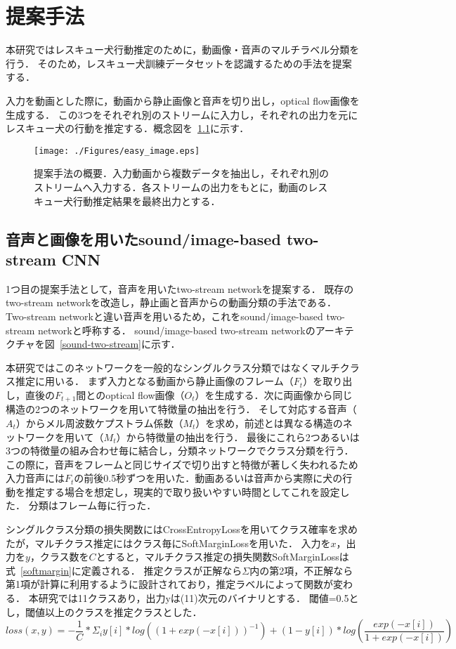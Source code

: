 \chapter{提案手法}
本研究ではレスキュー犬行動推定のために，動画像・音声のマルチラベル分類を行う．
そのため，レスキュー犬訓練データセットを認識するための手法を提案する．

入力を動画とした際に，動画から静止画像と音声を切り出し，optical flow画像を生成する．
この3つをそれぞれ別のストリームに入力し，それぞれの出力を元にレスキュー犬の行動を推定する．概念図を~\ref{easy_image}に示す．
\begin{figure}[H]
 \begin{center}
  \texttt{[image: ./Figures/easy\_image.eps]}
  \caption{提案手法の概要．入力動画から複数データを抽出し，それぞれ別のストリームへ入力する．各ストリームの出力をもとに，動画のレスキュー犬行動推定結果を最終出力とする．}
  \label{easy_image}
 \end{center}
\end{figure}

\section{音声と画像を用いたsound/image-based two-stream CNN}
1つ目の提案手法として，音声を用いたtwo-stream networkを提案する．
既存のtwo-stream networkを改造し，静止画と音声からの動画分類の手法である．
Two-stream networkと違い音声を用いるため，これをsound/image-based two-stream networkと呼称する．
sound/image-based two-stream networkのアーキテクチャを図~\ref{sound-two-stream}に示す．

本研究ではこのネットワークを一般的なシングルクラス分類ではなくマルチクラス推定に用いる．
まず入力となる動画から静止画像のフレーム（$F_t$）を取り出し，直後の$F_{t+1}$間とのoptical flow画像（$O_t$）を生成する．次に両画像から同じ構造の2つのネットワークを用いて特徴量の抽出を行う．
そして対応する音声（$A_t$）からメル周波数ケプストラム係数（$M_t$）を求め，前述とは異なる構造のネットワークを用いて（$M_t$）から特徴量の抽出を行う．
最後にこれら2つあるいは3つの特徴量の組み合わせ毎に結合し，分類ネットワークでクラス分類を行う．
この際に，音声をフレームと同じサイズで切り出すと特徴が著しく失われるため入力音声には$F_t$の前後0.5秒ずつを用いた．動画あるいは音声から実際に犬の行動を推定する場合を想定し，現実的で取り扱いやすい時間としてこれを設定した．
分類はフレーム毎に行った．

シングルクラス分類の損失関数にはCrossEntropyLossを用いてクラス確率を求めたが，マルチクラス推定にはクラス毎にSoftMarginLossを用いた．
入力を$x$，出力を$y$，クラス数を$C$とすると，マルチクラス推定の損失関数SoftMarginLossは式~\ref{softmargin}に定義される．
推定クラスが正解なら$\Sigma$内の第2項，不正解なら第1項が計算に利用するように設計されており，推定ラベルによって関数が変わる．
本研究では11クラスあり，出力yは(11)次元のバイナリとする．
閾値=0.5とし，閾値以上のクラスを推定クラスとした．
\begin{equation}
\label{softmargin}
loss(x, y) = -\frac{1}{C} * \Sigma_{i} y[i] * log((1+exp(-x[i]))^{-1}) + (1 - y[i]) * log(\frac{exp(-x[i])}{1+exp(-x[i])})
\end{equation}

